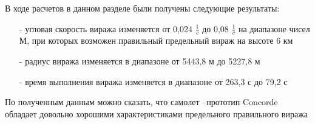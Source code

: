 В ходе расчетов в данном разделе были получены следующие результаты:
\begin{itemize}
    \item [-] угловая скорость виража изменяется от 0,024 $\frac{1}{c}$ до 0,08 $\frac{1}{c}$ на диапазоне
чисел М, при которых возможен правильный предельный вираж на высоте 6 км
    \item [-] радиус виража изменяется в диапазоне от 5443,8 м до 5227,8 м
    \item [-] время выполнения виража изменяется в диапазоне от 263,3 с до 79,2 с
\end{itemize}
По полученным данным можно сказать, что самолет –прототип Concorde обладает
довольно хорошими характеристиками предельного правильного виража





